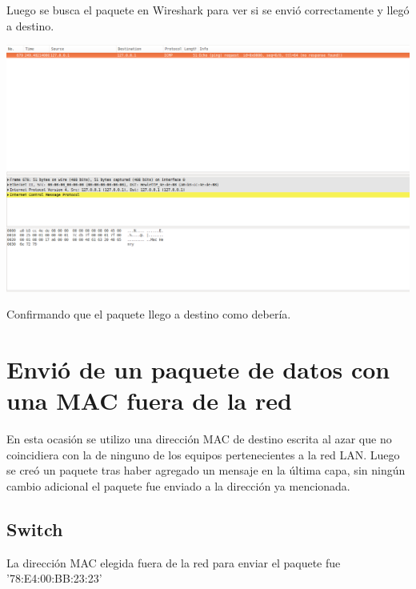 \documentclass[spanish]{udpreport}
\begin{document}
Luego se busca el paquete en Wireshark para ver si se envió correctamente y llegó a destino.\\

\begin{center}
	\includegraphics[scale=.27]{imagenes/Hub/ipmanti.png}
\end{center}

Confirmando que el paquete llego a destino como debería.

\pagebreak

\section{Envió de un paquete de datos con una MAC fuera de la red}

En esta ocasión se utilizo una dirección MAC de destino escrita al azar que no coincidiera con la de ninguno de los equipos pertenecientes a la red LAN. Luego se creó un paquete tras haber agregado un mensaje en la última capa, sin ningún cambio adicional el paquete fue enviado a la dirección ya mencionada.


\subsection{Switch}

La dirección MAC elegida fuera de la red para enviar el paquete fue '78:E4:00:BB:23:23'
\end{document}
